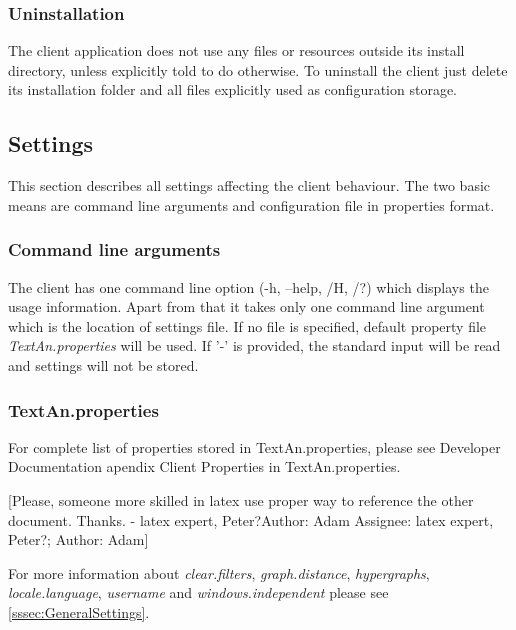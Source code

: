 \documentclass[12pt,a4paper]{report}
\makeatletter
\newcommand{\comment}[3][\@empty]{
  {\color{magenta}[#3 - }
  {\color{green}\ifx\@empty#1\relax Author: #2 \else Assignee: #1; Author: #2\fi}{\color{magenta}]}
}
\makeatother
\begin{document}
\subsubsection{Uninstallation}

The client application does not use any files or resources outside its install
directory, unless explicitly told to do otherwise.
To uninstall the client just delete its installation folder and all files
explicitly used as configuration storage.

\subsection{Settings}

This section describes all settings affecting the client behaviour.
The two basic means are command line arguments and configuration file in
properties format.

\subsubsection{Command line arguments}
\label{ssec:CliCmdArg}

The client has one command line option (-h, --help, /H, /?) which displays the
usage information. Apart from that it takes only one command line argument
which is the location of settings file. If no file is specified, default
property file \emph{TextAn.properties} will be used. If '-' is provided, the
standard input will be read and settings will not be stored.

\subsubsection{TextAn.properties}

For complete list of properties stored in TextAn.properties, please see
Developer Documentation apendix Client Properties in TextAn.properties.

\comment[latex expert, Peter?]{Adam}{Please, someone more skilled in latex use
proper way to reference the other document. Thanks.}

For more information about \emph{clear.filters}, \emph{graph.distance},
\emph{hypergraphs}, \emph{locale.language}, \emph{username}
and \emph{windows.independent} please see \ref{sssec:GeneralSettings}.
\end{document}
